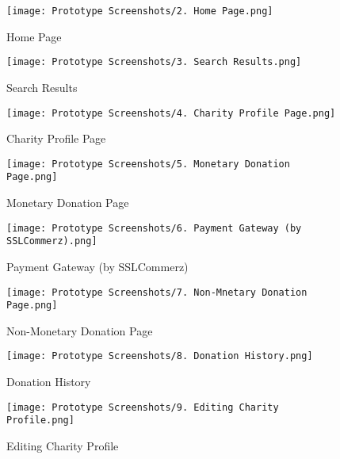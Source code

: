 \documentclass{scrreprt}
\begin{document}
        \begin{figure}[!h]
            \centering
            \texttt{[image: Prototype Screenshots/2. Home Page.png]}
            {\caption*{Home Page}}
        \end{figure}
        
        \begin{figure}[!h]
            \centering
            \texttt{[image: Prototype Screenshots/3. Search Results.png]}
            {\caption*{Search Results}}
        \end{figure}
        
        \begin{figure}[!h]
            \centering
            \texttt{[image: Prototype Screenshots/4. Charity Profile Page.png]}
            {\caption*{Charity Profile Page}}
        \end{figure}
        
        \begin{figure}[!h]
            \centering
            \texttt{[image: Prototype Screenshots/5. Monetary Donation Page.png]}
            {\caption*{Monetary Donation Page}}
        \end{figure}
        
        \begin{figure}[!h]
            \centering
            \texttt{[image: Prototype Screenshots/6. Payment Gateway (by SSLCommerz).png]}
            {\caption*{Payment Gateway (by SSLCommerz)}}
        \end{figure}
        
        \begin{figure}[!h]
            \centering
            \texttt{[image: Prototype Screenshots/7. Non-Mnetary Donation Page.png]}
            {\caption*{Non-Monetary Donation Page}}
        \end{figure}
        
        \begin{figure}[!h]
            \centering
            \texttt{[image: Prototype Screenshots/8. Donation History.png]}
            {\caption*{Donation History}}
        \end{figure}
        
        \begin{figure}[!h]
            \centering
            \texttt{[image: Prototype Screenshots/9. Editing Charity Profile.png]}
            {\caption*{Editing Charity Profile}}
        \end{figure}
\end{document}
